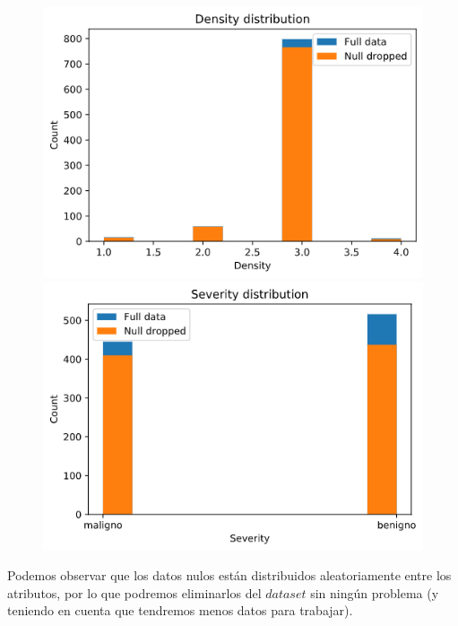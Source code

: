 \documentclass[11pt,a4paper]{article}
\begin{document}
\begin{figure}[H]
\centering

\begin{minipage}{0.5\textwidth}
    \centering
    \includegraphics[scale=0.35]{img/density-distribution.png}
\end{minipage}%
\begin{minipage}{0.5\textwidth}
    \centering
    \includegraphics[scale=0.35]{img/severity-distribution.png}
\end{minipage}

\end{figure}

Podemos observar que los datos nulos están distribuidos aleatoriamente entre los atributos, por lo que podremos eliminarlos del
$dataset$ sin ningún problema (y teniendo en cuenta que tendremos menos datos para trabajar).
\end{document}
